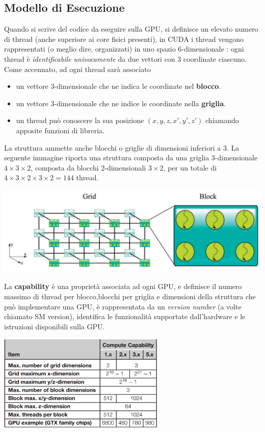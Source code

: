 \documentclass[10pt, letterpaper]{report}
\begin{document}
\subsection{Modello di Esecuzione}
Quando si scrive del codice da eseguire sulla GPU, si definisce un elevato numero di thread (anche superiore ai core fisici presenti), in CUDA i thread vengono rappresentati (o meglio dire, organizzati) in uno spazio 6-dimensionale : ogni thread è \textit{identificabile univocamente} da due vettori con 3 coordinate ciascuno. \acc 
Come accennato, ad ogni thread sarà associato \begin{itemize}
    \item un vettore 3-dimensionale che ne indica le coordinate nel \textbf{blocco}.
    \item un vettore 3-dimensionale che ne indice le coordinate nella \textbf{griglia}.
    \item un thread può conoscere la sua posizione $(x,y,z,x',y',z')$ chiamando apposite funzioni di libreria.
\end{itemize}
La struttura ammette anche blocchi o griglie di dimensioni inferiori a 3. La seguente immagine riporta una struttura composta da una griglia 3-dimensionale $4\times 3\times 2$, composta da blocchi 2-dimensionali $3\times 2$, per un totale di $4\times 3\times 2\times 3\times 2=144$ thread.
\begin{center}
    \includegraphics[width=\textwidth ]{images/griglia.png}
\end{center}
La \textbf{capability} è una proprietà associata ad ogni GPU, e definisce il numero massimo di thread per blocco,blocchi per griglia e dimensioni della struttura che può implementare una GPU, è rappresentata da un \textit{version number} (a volte chiamato SM version), identifica le funzionalità supportate dall'hardware e le istruzioni disponibili sulla GPU.\begin{center}
    \includegraphics[width=0.6\textwidth ]{images/capability.png}
\end{center}
\flowerLine 
\end{document}
